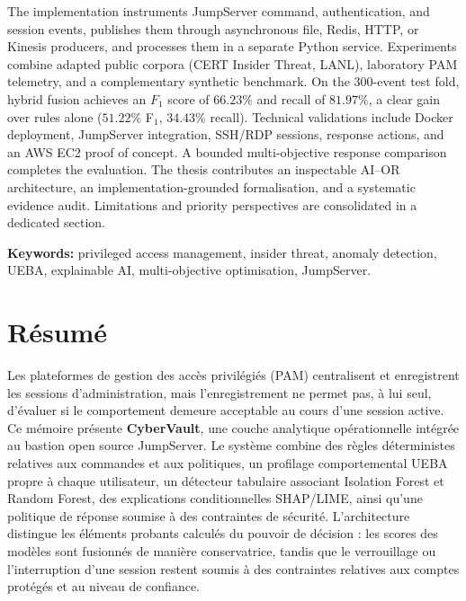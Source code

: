 \documentclass[11pt,a4paper,oneside]{report}
\theoremstyle{definition}
\theoremstyle{plain}
\begin{document}
The implementation instruments JumpServer command, authentication, and session events, publishes them through asynchronous file, Redis, HTTP, or Kinesis producers, and processes them in a separate Python service. Experiments combine adapted public corpora (CERT Insider Threat, LANL), laboratory PAM telemetry, and a complementary synthetic benchmark. On the 300-event test fold, hybrid fusion achieves an $F_1$ score of $66.23\%$ and recall of $81.97\%$, a clear gain over rules alone ($51.22\%$ F$_1$, $34.43\%$ recall). Technical validations include Docker deployment, JumpServer integration, SSH/RDP sessions, response actions, and an AWS EC2 proof of concept. A bounded multi-objective response comparison completes the evaluation. The thesis contributes an inspectable AI--OR architecture, an implementation-grounded formalisation, and a systematic evidence audit. Limitations and priority perspectives are consolidated in a dedicated section.

\medskip
\noindent\textbf{Keywords:} privileged access management, insider threat, anomaly detection, UEBA, explainable AI, multi-objective optimisation, JumpServer.

\chapter*{Résumé}
Les plateformes de gestion des accès privilégiés (PAM) centralisent et enregistrent les sessions d'administration, mais l'enregistrement ne permet pas, à lui seul, d'évaluer si le comportement demeure acceptable au cours d'une session active. Ce mémoire présente \textbf{CyberVault}, une couche analytique opérationnelle intégrée au bastion open source JumpServer. Le système combine des règles déterministes relatives aux commandes et aux politiques, un profilage comportemental UEBA propre à chaque utilisateur, un détecteur tabulaire associant Isolation Forest et Random Forest, des explications conditionnelles SHAP/LIME, ainsi qu'une politique de réponse soumise à des contraintes de sécurité. L'architecture distingue les éléments probants calculés du pouvoir de décision : les scores des modèles sont fusionnés de manière conservatrice, tandis que le verrouillage ou l'interruption d'une session restent soumis à des contraintes relatives aux comptes protégés et au niveau de confiance.
\end{document}
